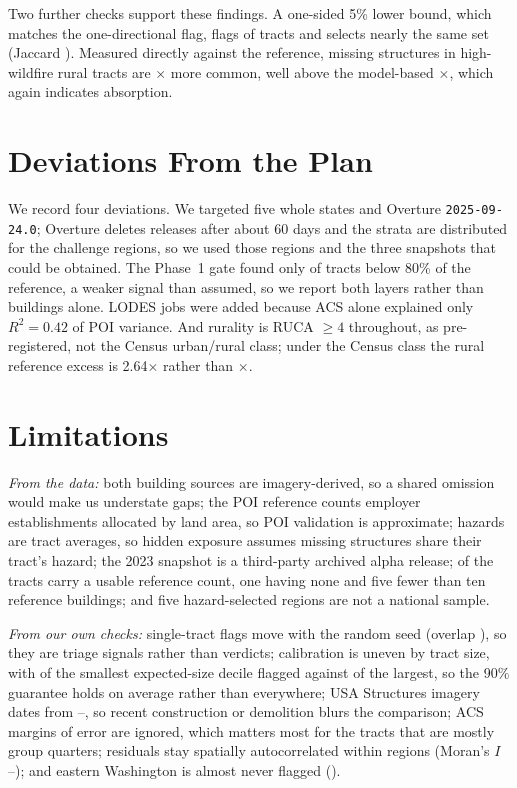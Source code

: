 \documentclass[conference]{IEEEtran}
\begin{document}
Two further checks support these findings. A one-sided 5\% lower bound, which matches the one-directional flag, flags \JoFlagRate{} of tracts and selects nearly the same set (Jaccard \JoJaccard{}). Measured directly against the reference, missing structures in high-wildfire rural tracts are \JhWildfireRural{}$\times$ more common, well above the model-based \HFiveWildRural{}$\times$, which again indicates absorption.

\section{Deviations From the Plan}
We record four deviations. We targeted five whole states and Overture \texttt{2025-09-24.0}; Overture deletes releases after about 60 days and the strata are distributed for the challenge regions, so we used those regions and the three snapshots that could be obtained. The Phase~1 gate found only \RefGapShare{} of tracts below 80\% of the reference, a weaker signal than assumed, so we report both layers rather than buildings alone. LODES jobs were added because ACS alone explained only $R^2=0.42$ of POI variance. And rurality is RUCA $\geq 4$ throughout, as pre-registered, not the Census urban/rural class; under the Census class the rural reference excess is 2.64$\times$ rather than \RvRuralRef{}$\times$.

\section{Limitations}
\emph{From the data:} both building sources are imagery-derived, so a shared omission would make us understate gaps; the POI reference counts employer establishments allocated by land area, so POI validation is approximate; hazards are tract averages, so hidden exposure assumes missing structures share their tract's hazard; the 2023 snapshot is a third-party archived alpha release; \RvN{} of the \NTracts{} tracts carry a usable reference count, one having none and five fewer than ten reference buildings; and five hazard-selected regions are not a national sample.

\emph{From our own checks:} single-tract flags move with the random seed (overlap \MgSeedOverlap{}), so they are triage signals rather than verdicts; calibration is uneven by tract size, with \MgFlagSmallDecile{} of the smallest expected-size decile flagged against \MgFlagLargeDecile{} of the largest, so the 90\% guarantee holds on average rather than everywhere; USA Structures imagery dates from \MgImgFirst{}--\MgImgLast{}, so recent construction or demolition blurs the comparison; ACS margins of error are ignored, which matters most for the \MgGqTracts{} tracts that are mostly group quarters; residuals stay spatially autocorrelated within regions (Moran's $I$ \MgMoranMin{}--\MgMoranMax{}); and eastern Washington is almost never flagged (\MgWaFlag{}).
\end{document}
